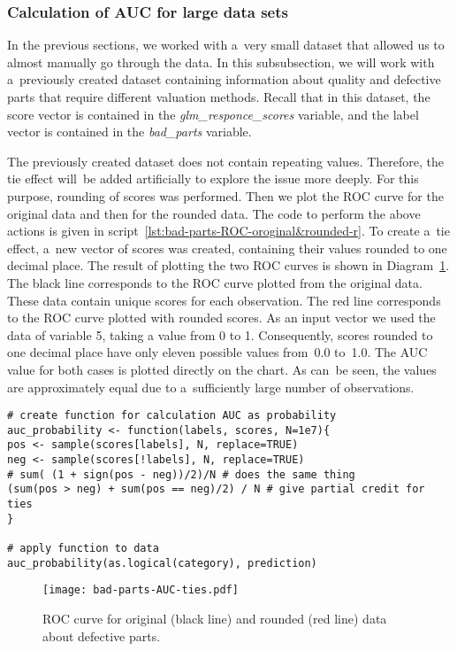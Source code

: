 \documentclass[]{scrreprt}
\begin{document}
\subsubsection{Calculation of AUC for large data sets}
In the previous sections, we worked with a~very small dataset that allowed us to almost manually go through the data. In this subsubsection, we will work with a~previously created dataset containing information about quality and defective parts that require different valuation methods. Recall that in this dataset, the score vector is contained in the \textit{glm\_responce\_scores} variable, and the label vector is contained in the \textit{bad\_parts} variable.

The previously created dataset does not contain repeating values. Therefore, the tie effect will~be added artificially to explore the issue more deeply. For this purpose, rounding of scores was performed. Then we plot the ROC curve for the original data and then for the rounded data. The code to perform the above actions is given in script~\ref{lst:bad-parts-ROC-oroginal&rounded-r}. To create a~tie effect, a~new vector of scores was created, containing their values rounded to one decimal place. The result of plotting the two ROC curves is shown in Diagram~\ref{fig:bad-parts-ROC-original&rounded-r}. The black line corresponds to the ROC curve plotted from the original data. These data contain unique scores for each observation. The red line corresponds to the ROC curve plotted with rounded scores. As an input vector we used the data of variable 5, taking a value from 0 to 1. Consequently, scores rounded to one decimal place have only eleven possible values from~0.0 to~1.0. The AUC value for both cases is plotted directly on the chart. As can~be seen, the values are approximately equal due to a~sufficiently large number of observations.
%
\begin{lstlisting}[float, caption = Plotting the ROC curve on the original (black line) and rounded (red line) defective parts data, firstnumber=1, label= lst:bad-parts-ROC-oroginal&rounded-r]
# create function for calculation AUC as probability
auc_probability <- function(labels, scores, N=1e7){
pos <- sample(scores[labels], N, replace=TRUE)
neg <- sample(scores[!labels], N, replace=TRUE)
# sum( (1 + sign(pos - neg))/2)/N # does the same thing
(sum(pos > neg) + sum(pos == neg)/2) / N # give partial credit for ties
}

# apply function to data
auc_probability(as.logical(category), prediction)
\end{lstlisting}
%
\begin{figure}[htp]
	\centering
	\texttt{[image: bad-parts-AUC-ties.pdf]}
	\caption{ROC curve for original (black line) and rounded (red line) data about defective parts.}
	\label{fig:bad-parts-ROC-original&rounded-r}
\end{figure}
%
\end{document}
